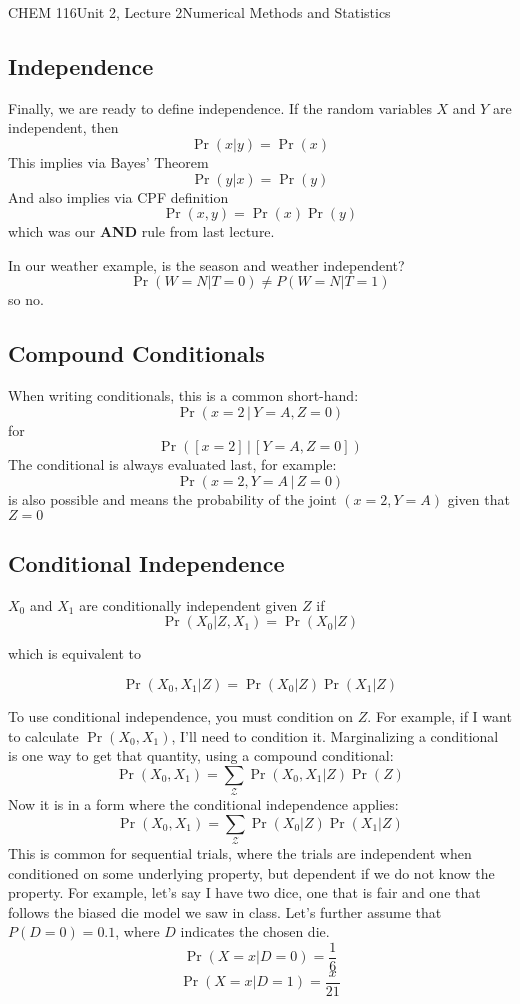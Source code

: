 \documentclass{article}
\begin{document}
\begin{tdoc}{CHEM 116}{Unit 2, Lecture 2}{Numerical Methods and Statistics}
\subsection{Independence}
Finally, we are ready to define independence. If the random variables
$X$ and $Y$ are independent, then
\begin{equation}
\Pr(x|y) = \Pr(x)
\end{equation}
This implies via Bayes' Theorem
\begin{equation}
\Pr(y|x) = \Pr(y)
\end{equation}
And also implies via CPF definition
\begin{equation}
\Pr(x,y) = \Pr(x)\Pr(y)
\end{equation}
which was our {\bf AND} rule from last lecture.

\vspace{0.2cm}
In our weather example, is the season and weather independent? 
\[
\Pr(W=N|T=0) \neq P(W=N|T=1)
\]
so no.


\subsection{Compound Conditionals}
When writing conditionals, this is a common short-hand:
\[
\Pr (x = 2\, | \,Y = A, Z = 0)
\]
for 
\[
\Pr ([x = 2]\,|\, [Y = A, Z = 0])
\]
The conditional is always evaluated last, for example:
\[
\Pr(x = 2, Y = A\, | \,Z = 0)
\]
is also possible and means the probability of the joint $(x=2, Y=A)$
given that $Z = 0$ 



\subsection{Conditional Independence}
$X_0$ and $X_1$ are conditionally independent given $Z$ if
\begin{equation}
\Pr(X_0 | Z, X_1) = \Pr(X_0 | Z)
\end{equation}

which is equivalent to

\begin{equation}
\Pr(X_0, X_1 | Z) = \Pr(X_0 | Z)\Pr(X_1 | Z)
\end{equation}


To use conditional independence, you must condition on $Z$. For
example, if I want to calculate $\Pr(X_0, X_1)$, I'll need to
condition it. Marginalizing a conditional is one way to get that
quantity, using a compound conditional:
\[
\Pr(X_0, X_1) = \sum_\mathcal{Z}\Pr(X_0, X_1 | Z) \Pr(Z)
\]
Now it is in a form where the conditional independence applies:
\[
\Pr(X_0, X_1) = \sum_\mathcal{Z}\Pr(X_0 | Z) \Pr(X_1 | Z)
\]
This is common for sequential trials, where the trials are independent
when conditioned on some underlying property, but dependent if we do
not know the property. For example, let's say I have two dice, one
that is fair and one that follows the biased die model we saw in
class. Let's further assume that $P(D = 0) = 0.1$, where $D$ indicates
the chosen die.
\[
\Pr(X=x | D = 0) = \frac{1}{6}
\]
\[
\Pr(X=x | D = 1) = \frac{x}{21}
\]


\end{tdoc}
\end{document}
